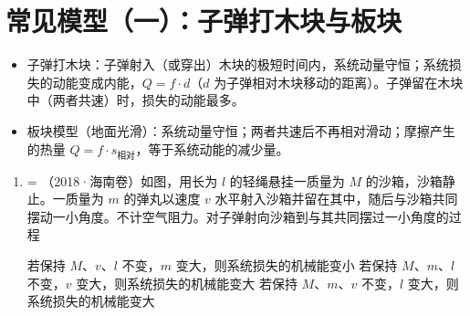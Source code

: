 \documentclass[\gkver]{gaokaozhenti}
\makeatletter
\newcommand{\tiinfo}[2]{{\small\color{gray}（#1）\textcolor{orange!85!black}{\nandu{#2}}}\hspace{0.4em}}
\newenvironment{tibody}
  {\begin{minipage}[t]{\linewidth}\@listdepth=\@ne\leavevmode\ignorespaces}
  {\end{minipage}}
\makeatother
\begin{document}
\section{常见模型（一）：子弹打木块与板块}
\begin{yaodian}
\begin{itemize}
\item 子弹打木块：子弹射入（或穿出）木块的极短时间内，系统动量守恒；系统损失的动能变成内能，$Q=f\cdot d$（$d$ 为子弹相对木块移动的距离）。子弹留在木块中（两者共速）时，损失的动能最多。
\item 板块模型（地面光滑）：系统动量守恒；两者共速后不再相对滑动；摩擦产生的热量 $Q=f\cdot s_{\text{相对}}$，等于系统动能的减少量。
\end{itemize}
\end{yaodian}
\begin{enumerate}[resume=tiku]
\item
\begin{tibody}
\tiinfo{2018·海南卷}{2}如图，用长为 $l$ 的轻绳悬挂一质量为 $M$ 的沙箱，沙箱静止。一质量为 $m$ 的弹丸以速度 $v$ 水平射入沙箱并留在其中，随后与沙箱共同摆动一小角度。不计空气阻力。对子弹射向沙箱到与其共同摆过一小角度的过程

\onepicture[h=3.6cm]{}

{若保持 $M$、$v$、$l$ 不变，$m$ 变大，则系统损失的机械能变小}
{若保持 $M$、$m$、$l$ 不变，$v$ 变大，则系统损失的机械能变大}
{若保持 $M$、$m$、$v$ 不变，$l$ 变大，则系统损失的机械能变大}
\end{tibody}

\end{enumerate}
\end{document}
